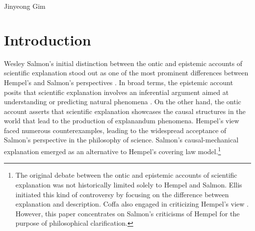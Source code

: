 \begin{artengenv}{Jinyeong Gim}
\section*{Introduction}
\lettrine[loversize=0.13,lines=2,lraise=-0.03,nindent=0em,findent=0.2pt]%
{W}{}esley Salmon's initial distinction between the ontic and epistemic accounts of scientific explanation stood out as one of the most prominent differences between Hempel's and Salmon's perspectives
\parencites*[][]{salmon_scientific_1984}[][]{salmon_four_1989}. %
 In broad terms, the epistemic account posits that scientific explanation involves an inferential argument aimed at understanding or predicting natural phenomena 
\parencites[see][]{hempel_studies_1948}[][]{hempel_aspects_1965}. %
 On the other hand, the ontic account asserts that scientific explanation showcases the causal structures in the world that lead to the production of explanandum phenomena. Hempel's view faced numerous counterexamples, leading to the widespread acceptance of Salmon's perspective in the philosophy of science. Salmon's causal-mechanical explanation emerged as an alternative to Hempel's covering law model.\footnote{The original debate between the ontic and epistemic accounts of scientific explanation was not historically limited solely to Hempel and Salmon. Ellis 
\parencite*[][]{ellis_relation_1956} %
 initiated this kind of controversy by focusing on the difference between explanation and description. Coffa 
\parencite*[][]{coffa_foundations_1973} %
 also engaged in criticizing Hempel's view 
\parencite[see][]{wright_ontic_2018}. %
 However, this paper concentrates on Salmon's criticisms of Hempel for the purpose of philosophical clarification.}


\end{artengenv}
